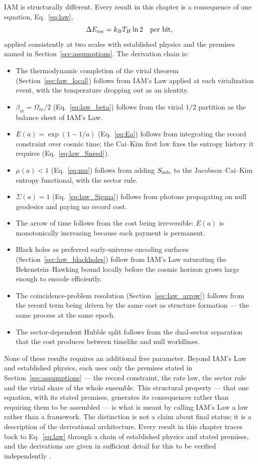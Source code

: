 IAM is structurally different. Every result in this chapter is a consequence of one equation, Eq.~\eqref{eq:law},
\begin{equation*}
\Delta E_{\rm rec}=k_BT_H\ln2\quad\text{per bit},
\end{equation*}
applied consistently at two scales with established physics and the premises named in Section~\ref{sec:assumptions}. The derivation chain is:
\begin{itemize}
\item The thermodynamic completion of the virial theorem (Section~\ref{sec:law_local}) follows from IAM's Law applied at each virialization event, with the
temperature dropping out as an identity.
\item $\beta_m=\Omega_m/2$ (Eq.~\eqref{eq:law_beta}) follows from the virial $1/2$ partition as the balance sheet of IAM's Law.
\item $E(a)=\exp(1-1/a)$ (Eq.~\eqref{eq:Ea}) follows from integrating the record constraint over cosmic time; the Cai--Kim first law fixes the entropy
history it requires (Eq.~\eqref{eq:law_Sneed}).
\item $\mu(a)<1$ (Eq.~\eqref{eq:mu}) follows from adding $S_{\rm info}$ to the Jacobson--Cai--Kim entropy functional, with the sector rule.
\item $\Sigma(a)=1$ (Eq.~\eqref{eq:law_Sigma}) follows from photons propagating on null geodesics and paying no record cost.
\item The arrow of time follows from the cost being irreversible: $E(a)$ is monotonically increasing because each payment is permanent.
\item Black holes as preferred early-universe encoding surfaces (Section~\ref{sec:law_blackholes}) follow from IAM's Law saturating the Bekenstein--Hawking
bound locally before the cosmic horizon grows large enough to encode efficiently.
\item The coincidence-problem resolution (Section~\ref{sec:law_arrow}) follows from the record term being driven by the same cost as structure formation
--- the same process at the same epoch.
\item The sector-dependent Hubble split follows from the dual-sector separation that the cost produces between timelike and null worldlines.
\end{itemize}
None of these results requires an additional free parameter. Beyond IAM's Law and established physics, each uses only the premises stated in
Section~\ref{sec:assumptions} --- the record constraint, the rate law, the sector rule and the virial share of the whole ensemble. This structural property ---
that one equation, with its stated premises, generates its consequences rather than requiring them to be assembled --- is what is meant by calling IAM's Law
a law rather than a framework. The distinction is not a claim about final status; it is a description of the derivational architecture. Every result in
this chapter traces back to Eq.~\eqref{eq:law} through a chain of established physics and stated premises, and the derivations are given in sufficient
detail for this to be verified independently \interp.

